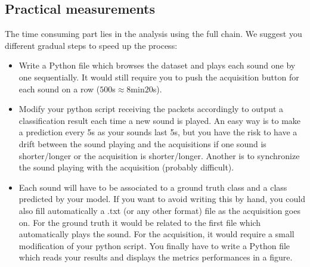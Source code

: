 \subsection{Practical measurements}
%
The time consuming part lies in the analysis using the full chain. We suggest you different gradual steps to speed up the process:
%
\begin{itemize}
    \item Write a Python file which browses the dataset and plays each sound one by one sequentially. It would still require you to push the acquisition button for each sound on a row ($500$s$\approx 8$min$20$s).
    \item Modify your python script receiving the packets accordingly to output a classification result each time a new sound is played. 
    An easy way is to make a prediction every 5s as your sounds last 5s, but you have the risk to have a drift between the sound playing and the acquisitions if one sound is shorter/longer or the acquisition is shorter/longer.
    Another is to synchronize the sound playing with the acquisition (probably difficult).
    \item Each sound will have to be associated to a ground truth class and a class predicted by your model. If you want to avoid writing this by hand, you could also fill automatically a .txt (or any other format) file as the acquisition goes on.
    For the ground truth it would be related to the first file which automatically
    plays the sound. For the acquisition, it would require a small modification of your python script.
    You finally have to write a Python file which reads your results and displays the metrics performances in a figure.
\end{itemize}
